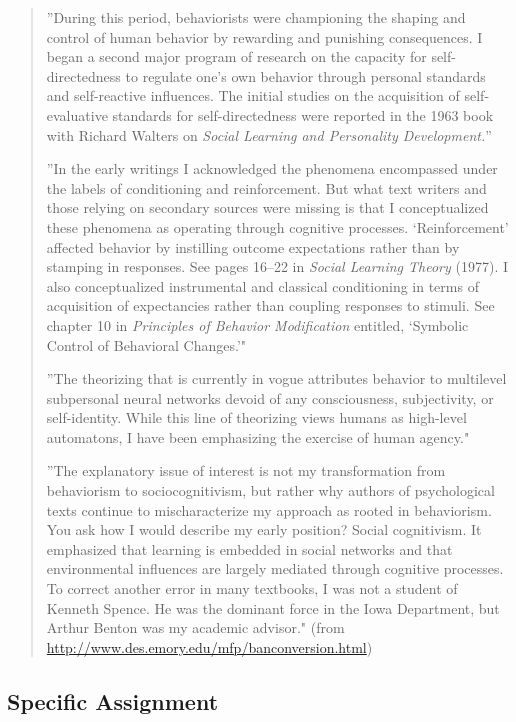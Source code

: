 \begin{refsection}
\begin{quote}
”During this period, behaviorists were championing the shaping and control of human behavior by rewarding and punishing consequences. I began a second major program of research on the capacity for self-directedness to regulate one's own behavior through personal standards and self-reactive influences. The initial studies on the acquisition of self-evaluative standards for self-directedness were reported in the 1963 book with Richard Walters on \emph{Social Learning and Personality Development.}”

”In the early writings I acknowledged the phenomena encompassed under the labels of conditioning and reinforcement. But what text writers and those relying on secondary sources were missing is that I conceptualized these phenomena as operating through cognitive processes. `Reinforcement' affected behavior by instilling outcome expectations rather than by stamping in responses. See pages 16--22 in \emph{Social Learning Theory} (1977). I also conceptualized instrumental and classical conditioning in terms of acquisition of expectancies rather than coupling responses to stimuli. See chapter 10 in \emph{Principles of Behavior Modification} entitled, `Symbolic Control of Behavioral Changes.'"

”The theorizing that is currently in vogue attributes behavior to multilevel subpersonal neural networks devoid of any consciousness, subjectivity, or self-identity. While this line of theorizing views humans as high-level automatons, I have been emphasizing the exercise of human agency."

”The explanatory issue of interest is not my transformation from behaviorism to sociocognitivism, but rather why authors of psychological texts continue to mischaracterize my approach as rooted in behaviorism. You ask how I would describe my early position? Social cognitivism. It emphasized that learning is embedded in social networks and that environmental influences are largely mediated through cognitive processes. To correct another error in many textbooks, I was not a student of Kenneth Spence. He was the dominant force in the Iowa Department, but Arthur Benton was my academic advisor." (from \url{http://www.des.emory.edu/mfp/banconversion.html})
\end{quote}

\subsection{Specific Assignment}
\label{specificassignment}


\end{refsection}
